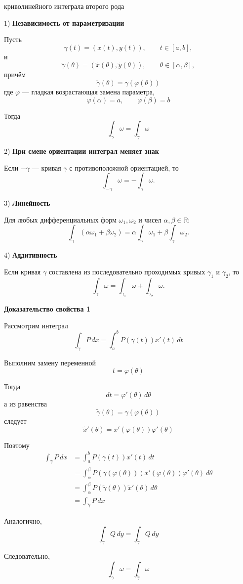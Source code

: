 \documentclass[12pt,a4paper]{article}
\begin{document}
\begin{props}{криволинейного интеграла второго рода}

1) \textbf{Независимость от параметризации}

Пусть
\[
\gamma(t)=(x(t),y(t)),
\qquad t\in[a,b],
\]
и
\[
\widetilde{\gamma}(\theta)
=
(\widetilde{x}(\theta),\widetilde{y}(\theta)),
\qquad \theta\in[\alpha,\beta],
\]
причём
\[
\widetilde{\gamma}(\theta)
=
\gamma(\varphi(\theta))
\]
где $\varphi$ — гладкая возрастающая замена параметра,
\[
\varphi(\alpha)=a,\qquad
\varphi(\beta)=b
\]

Тогда
\[
\int_\gamma\omega
=
\int_{\widetilde{\gamma}}\omega
\]

2) \textbf{При смене ориентации интеграл меняет знак}

Если $-\gamma$ — кривая $\gamma$ с противоположной ориентацией, то
\[
\int_{-\gamma}\omega
=
-\int_\gamma\omega.
\]

3) \textbf{Линейность}

Для любых дифференциальных форм $\omega_1,\omega_2$ и чисел $\alpha,\beta\in\mathbb{R}$:
\[
\int_\gamma
(\alpha\omega_1+\beta\omega_2)
=
\alpha\int_\gamma\omega_1
+
\beta\int_\gamma\omega_2.
\]

4) \textbf{Аддитивность}

Если кривая $\gamma$ составлена из последовательно проходимых кривых $\gamma_1$ и $\gamma_2$, то
\[
\int_\gamma\omega
=
\int_{\gamma_1}\omega
+
\int_{\gamma_2}\omega.
\]

\end{props}

\textbf{Доказательство свойства 1}

\begin{proofbox}
Рассмотрим интеграл
\[
\int_\gamma P\,dx
=
\int_a^b P(\gamma(t))x'(t)\,dt
\]

Выполним замену переменной
\[
t=\varphi(\theta)
\]

Тогда
\[
dt=\varphi'(\theta)\,d\theta
\]
а из равенства
\[
\widetilde{\gamma}(\theta)
=
\gamma(\varphi(\theta))
\]
следует
\[
\widetilde{x}'(\theta)
=
x'(\varphi(\theta))\varphi'(\theta)
\]

Поэтому
\[
\begin{aligned}
\int_\gamma P\,dx
&=
\int_a^b P(\gamma(t))x'(t)\,dt
\\
&=
\int_\alpha^\beta
P(\gamma(\varphi(\theta)))
x'(\varphi(\theta))
\varphi'(\theta)\,d\theta
\\
&=
\int_\alpha^\beta
P(\widetilde{\gamma}(\theta))
\widetilde{x}'(\theta)\,d\theta
\\
&=
\int_{\widetilde{\gamma}}P\,dx
\end{aligned}
\]

Аналогично,
\[
\int_\gamma Q\,dy
=
\int_{\widetilde{\gamma}}Q\,dy
\]

Следовательно,
\[
\int_\gamma\omega
=
\int_{\widetilde{\gamma}}\omega
\]
\end{proofbox}
\end{document}
